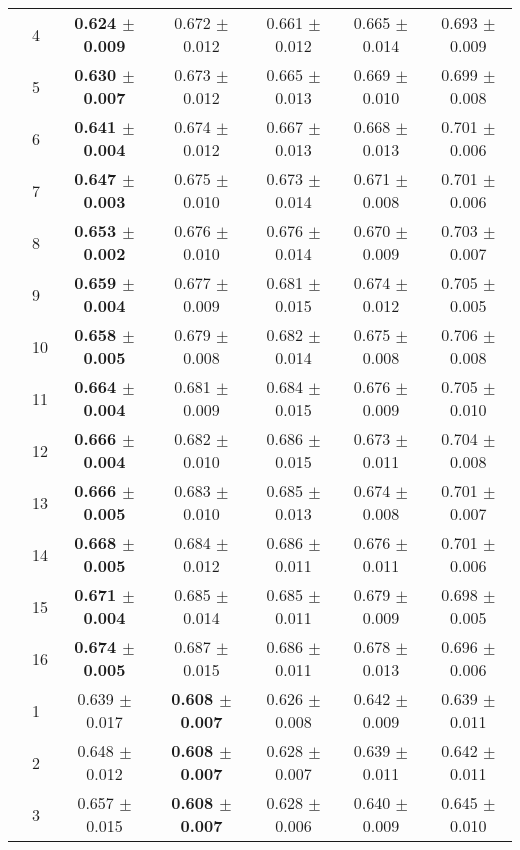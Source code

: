\begin{table*}[t]
{\begin{tabular}{ll c c c c c}
        & 4 & \textbf{0.624 $\pm$ 0.009} & 0.672 $\pm$ 0.012 & 0.661 $\pm$ 0.012 & 0.665 $\pm$ 0.014 & 0.693 $\pm$ 0.009 \\
        & 5 & \textbf{0.630 $\pm$ 0.007} & 0.673 $\pm$ 0.012 & 0.665 $\pm$ 0.013 & 0.669 $\pm$ 0.010 & 0.699 $\pm$ 0.008 \\
        & 6 & \textbf{0.641 $\pm$ 0.004} & 0.674 $\pm$ 0.012 & 0.667 $\pm$ 0.013 & 0.668 $\pm$ 0.013 & 0.701 $\pm$ 0.006 \\
        & 7 & \textbf{0.647 $\pm$ 0.003} & 0.675 $\pm$ 0.010 & 0.673 $\pm$ 0.014 & 0.671 $\pm$ 0.008 & 0.701 $\pm$ 0.006 \\
        & 8 & \textbf{0.653 $\pm$ 0.002} & 0.676 $\pm$ 0.010 & 0.676 $\pm$ 0.014 & 0.670 $\pm$ 0.009 & 0.703 $\pm$ 0.007 \\
        & 9 & \textbf{0.659 $\pm$ 0.004} & 0.677 $\pm$ 0.009 & 0.681 $\pm$ 0.015 & 0.674 $\pm$ 0.012 & 0.705 $\pm$ 0.005 \\
        & 10 & \textbf{0.658 $\pm$ 0.005} & 0.679 $\pm$ 0.008 & 0.682 $\pm$ 0.014 & 0.675 $\pm$ 0.008 & 0.706 $\pm$ 0.008 \\
        & 11 & \textbf{0.664 $\pm$ 0.004} & 0.681 $\pm$ 0.009 & 0.684 $\pm$ 0.015 & 0.676 $\pm$ 0.009 & 0.705 $\pm$ 0.010 \\
        & 12 & \textbf{0.666 $\pm$ 0.004} & 0.682 $\pm$ 0.010 & 0.686 $\pm$ 0.015 & 0.673 $\pm$ 0.011 & 0.704 $\pm$ 0.008 \\
        & 13 & \textbf{0.666 $\pm$ 0.005} & 0.683 $\pm$ 0.010 & 0.685 $\pm$ 0.013 & 0.674 $\pm$ 0.008 & 0.701 $\pm$ 0.007 \\
        & 14 & \textbf{0.668 $\pm$ 0.005} & 0.684 $\pm$ 0.012 & 0.686 $\pm$ 0.011 & 0.676 $\pm$ 0.011 & 0.701 $\pm$ 0.006 \\
        & 15 & \textbf{0.671 $\pm$ 0.004} & 0.685 $\pm$ 0.014 & 0.685 $\pm$ 0.011 & 0.679 $\pm$ 0.009 & 0.698 $\pm$ 0.005 \\
        & 16 & \textbf{0.674 $\pm$ 0.005} & 0.687 $\pm$ 0.015 & 0.686 $\pm$ 0.011 & 0.678 $\pm$ 0.013 & 0.696 $\pm$ 0.006 \\
\midrule
\assist{} & 1 & 0.639 $\pm$ 0.017 & \textbf{0.608 $\pm$ 0.007} & 0.626 $\pm$ 0.008 & 0.642 $\pm$ 0.009 & 0.639 $\pm$ 0.011 \\
        & 2 & 0.648 $\pm$ 0.012 & \textbf{0.608 $\pm$ 0.007} & 0.628 $\pm$ 0.007 & 0.639 $\pm$ 0.011 & 0.642 $\pm$ 0.011 \\
        & 3 & 0.657 $\pm$ 0.015 & \textbf{0.608 $\pm$ 0.007} & 0.628 $\pm$ 0.006 & 0.640 $\pm$ 0.009 & 0.645 $\pm$ 0.010 \\

\end{tabular}}
\end{table*}
